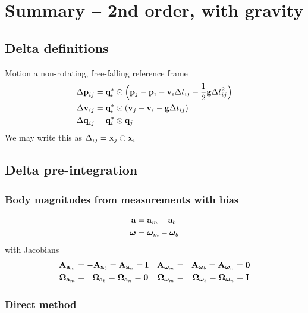 
\section{Summary -- 2nd order, with gravity}
\label{sec:summary-gravity-2nd}

\subsection{Delta definitions}

Motion \wrt a non-rotating, free-falling reference frame
%
\begin{align}
\begin{split}
{\Delta{\bf p}}_{ij} &= {\bf q}_i^*\odot\Big({\bf p}_j - {\bf p}_i - {\bf v}_i\Delta t_{ij} - \frac12{\bf g}\Delta t_{ij}^2\Big) \\
{\Delta{\bf v}}_{ij} &= {\bf q}_i^*\odot({\bf v}_j - {\bf v}_i - {\bf g}\Delta t_{ij}) \\
{\Delta{\bf q}}_{ij} &= {\bf q}_i^*\otimes{\bf q}_j 
\end{split}
\end{align}
%
We may write this as $\Delta_{ij}={\bf x}_j\ominus{\bf x}_i$

\subsection{Delta pre-integration}

\subsubsection{Body magnitudes from measurements with bias}

\begin{align}
\begin{split}
{\bf a} &= {\bf a}_m - {{\bf a}_b} \\
{{\bm \omega}} &= {{\bm \omega}}_m - {{{\bm \omega}}_b}
\end{split}
\end{align}
%
with Jacobians
%
\begin{align*}
{\bf A}_{{\bf a}_m} 
  &= -{\bf A}_{{\bf a}_b} = {\bf A}_{{\bf a}_n} = {\bf I} 
& {\bf A}_{{{\bm \omega}}_m} 
  &= ~~{\bf A}_{{{\bm \omega}}_b} = {\bf A}_{{{\bm \omega}}_n} = \bf0 \\
{\bm \Omega}_{{\bf a}_m} 
  &= ~~{\bm \Omega}_{{\bf a}_b} = {\bm \Omega}_{{\bf a}_n} = \bf0 
& {\bm \Omega}_{{{\bm \omega}}_m} 
  &= -{\bm \Omega}_{{{\bm \omega}}_b} = {\bm \Omega}_{{{\bm \omega}}_n} = {\bf I} 
\end{align*}


\subsubsection{Direct method}

